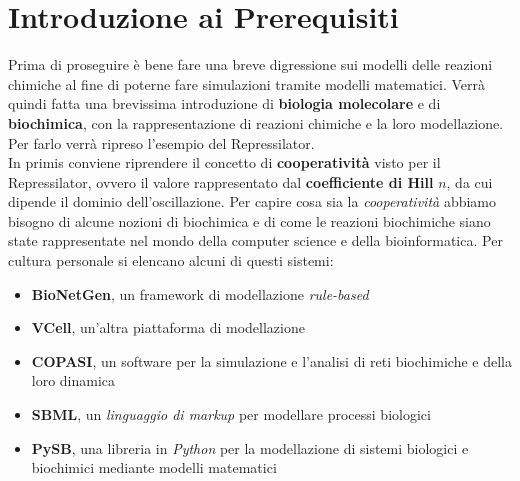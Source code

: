 \documentclass[a4paper,12pt, oneside]{book}
\begin{document}
\chapter{Introduzione ai Prerequisiti}
Prima di proseguire è bene fare una breve digressione sui modelli delle reazioni
chimiche al fine di poterne fare simulazioni tramite modelli matematici. Verrà
quindi fatta una brevissima introduzione di \textbf{biologia molecolare} e di
\textbf{biochimica}, con la rappresentazione di reazioni chimiche e la loro
modellazione. Per farlo verrà ripreso l'esempio del Repressilator.\\ 
In primis conviene riprendere il concetto di \textbf{cooperatività} visto per il
Repressilator, ovvero il valore rappresentato dal \textbf{coefficiente di Hill}
$n$, da cui dipende il dominio dell'oscillazione. Per capire cosa sia la
\textit{cooperatività} abbiamo bisogno di alcune nozioni di biochimica e di come
le reazioni biochimiche siano state rappresentate nel mondo della computer
science e della bioinformatica. Per cultura personale si elencano alcuni di
questi sistemi:
\begin{itemize}
  \item \textbf{BioNetGen}, un framework di modellazione \textit{rule-based}
  \item \textbf{VCell}, un'altra piattaforma di modellazione
  \item \textbf{COPASI}, un software per la simulazione e l'analisi di reti
  biochimiche e della loro dinamica
  \item \textbf{SBML}, un \textit{linguaggio di markup} per modellare processi
  biologici 
  \item \textbf{PySB}, una libreria in \textit{Python} per la modellazione di
  sistemi biologici e biochimici mediante modelli matematici
\end{itemize}
\end{document}
